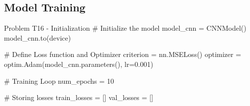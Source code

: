 \documentclass[12pt, a4paper]{article}
\begin{document}
            \subsection{Model Training}
                \begin{codeblock}{Problem T16 - Initialization}
                    # Initialize the model
                    model_cnn = CNNModel()
                    model_cnn.to(device)

                    # Define Loss function and Optimizer
                    criterion = nn.MSELoss() 
                    optimizer = optim.Adam(model_cnn.parameters(), lr=0.001)

                    # Training Loop
                    num_epochs = 10

                    # Storing losses
                    train_losses = []
                    val_losses = []
                \end{codeblock}
\end{document}
